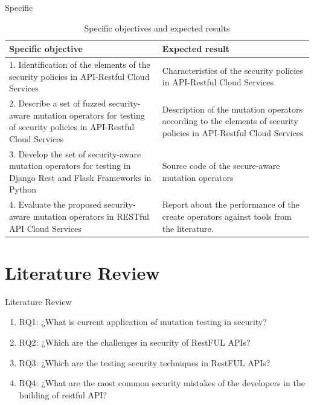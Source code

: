 \documentclass[10pt]{beamer}
\theoremstyle{remark}
\theoremstyle{definition}
\begin{document}
\begin{frame}{Specific}

\begin{table}[H]
    \centering
    \begin{tabular}{|p{}|p{}|}
        \hline
         \textbf{Specific objective} & \textbf{Expected result} \\ \hline
         1.  Identification of the elements of the security policies in API-Restful Cloud Services &  Characteristics of the security policies in API-Restful Cloud Services  \\  \hline
         2. Describe a set of fuzzed security-aware mutation operators for testing of security policies in API-Restful Cloud Services & Description of the mutation operators according to the elements of security policies in API-Restful Cloud Services  \\  \hline
         3. Develop the set of security-aware mutation operators for testing in Django Rest and Flask Frameworks in Python    & Source code of the secure-aware mutation operators \\  \hline
         4. Evaluate the proposed security-aware mutation operators in RESTful API Cloud Services & Report about the performance of the create operators against tools from the literature.
         \\ \hline
    \end{tabular}
    \caption{Specific objectives and expected results}
    \label{tab:objetivos}
\end{table}
\end{frame}

\section{Literature Review}

\begin{frame}{Literature Review}
\begin{enumerate}
    \item RQ1: ¿What is current application of mutation testing in security?
    \item RQ2: ¿Which are the challenges in security of RestFUL APIs?
    \item RQ3: ¿Which are the testing  security techniques in RestFUL APIs?
    \item RQ4: ¿What are the most common security mistakes of the developers in the building of restful API?
\end{enumerate}
\end{frame}
\end{document}
